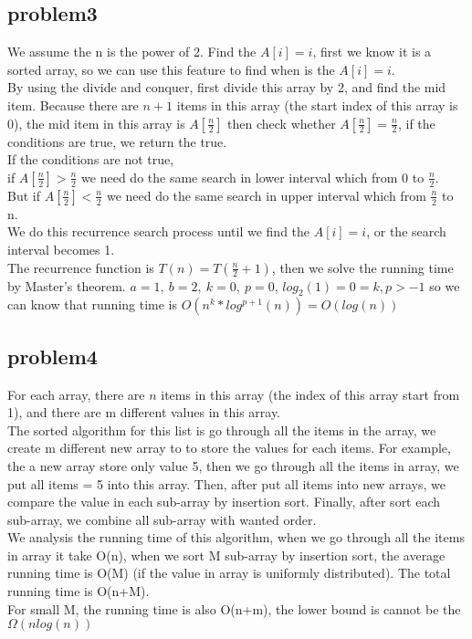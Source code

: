 \documentclass[11pt]{article}
\begin{document}
\subsection{problem3}
We assume the n is the power of 2. Find the $A[i]=i$, first we know it is a sorted array, so we can use this feature to find when is the $A[i]=i$. \\
By using the divide and conquer, first divide this array by 2, and find the mid item. Because there are $n+1$ items in this array (the start index of this array is 0), the mid item in this array is $A[\frac{n}{2}]$ then check whether $A[\frac{n}{2}]=\frac{n}{2}$, if the conditions are true, we return the true. \\ If the conditions are not true, \\ if $A[\frac{n}{2}]>\frac{n}{2}$ we need do the same search in lower interval which from 0 to $\frac{n}{2}$. \\ But if $A[\frac{n}{2}]<\frac{n}{2}$ we need do the same search in upper interval which from $\frac{n}{2}$ to n. \\ We do this recurrence search process until we find the $A[i]=i$, or the search interval becomes 1.\\
The recurrence function is $T(n)=T(\frac{n}{2}+1)$, then we solve the running time by Master’s theorem. $a=1, \ b=2, \ k=0, \ p=0$, $log_2(1)=0=k, p>-1$ so we can know that running time is $O(n^k*log^{p+1}(n))=O(log(n))$

\subsection{problem4}
For each array, there are $n$ items in this array (the index of this array start from 1), and there are m different values in this array. \\
The sorted algorithm for this list is go through all the items in the array, we create m different new array to to store the values for each items. For example, the a new array store only value 5, then we go through all the items in array, we put all items = 5 into this array. Then, after put all items into new arrays, we compare the value in each sub-array by insertion sort. Finally, after sort each sub-array, we combine all sub-array with wanted order.  \\ We analysis the running time of this algorithm, when we go through all the items in array it take O(n), when we sort M sub-array by insertion sort, the average running time is O(M) (if the value in array is uniformly distributed). The total running time is O(n+M). \\
For small M, the running time is also O(n+m), the lower bound is cannot be the $\Omega(nlog(n))$
\end{document}
